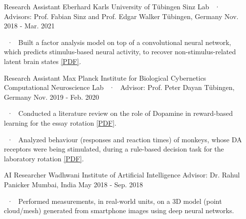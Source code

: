 \begin{cventries}
  \cventryLab
    {Research Assistant} %
    {Eberhard Karls University of Tübingen} %
    {Sinz Lab ~·~ Advisors: Prof. Fabian Sinz and Prof. Edgar Walker} %
    {Tübingen, Germany} %
    {Nov. 2018 - Mar. 2021} %
    { %
      \begin{cvitems}
      \item ~·~ Built a factor analysis model on top of a convolutional neural network, which predicts stimulus-based neural activity, to recover non-stimulus-related latent brain states \href{https://proceedings.neurips.cc/paper/2021/file/84a529a92de322be42dd3365afd54f91-Paper.pdf}{[PDF]}. 
      \end{cvitems}
    }

  \cventryLab
    {Research Assistant} %
    {Max Planck Institute for Biological Cybernetics} %
    {Computational Neuroscience Lab ~·~ Advisor: Prof. Peter Dayan}%
    {Tübingen, Germany} %
    {Nov. 2019 - Feb. 2020}
    {%
    \begin{cvitems}
    \item ~·~ Conducted a literature review on the role of Dopamine in reward-based learning for the essay rotation \href{https://drive.google.com/file/d/1OEo0gj_9koHtPa58SKOdccETzw48jGHZ/view?usp=sharing}{[PDF]}. 
    \item ~·~ Analyzed behaviour (responses and reaction times) of monkeys, whose DA receptors were being stimulated, during a rule-based decision task for the laboratory rotation \href{https://drive.google.com/file/d/1bqvoALW3b3Ovm6vpJbzl-hcy932nN__t/view?usp=sharing}{[PDF]}. 
    \end{cvitems}
    }

  \cventryLab
    {AI Researcher} %
    {Wadhwani Institute of Artificial Intelligence} %
    {Advisor: Dr. Rahul Panicker} %
    {Mumbai, India} %
    {May 2018 - Sep. 2018} %
    { %
      \begin{cvitems}
      \item ~·~ Performed measurements, in real-world units, on a 3D model (point cloud/mesh) generated from smartphone images using deep neural networks.
      \end{cvitems}
    }
    

\end{cventries}
